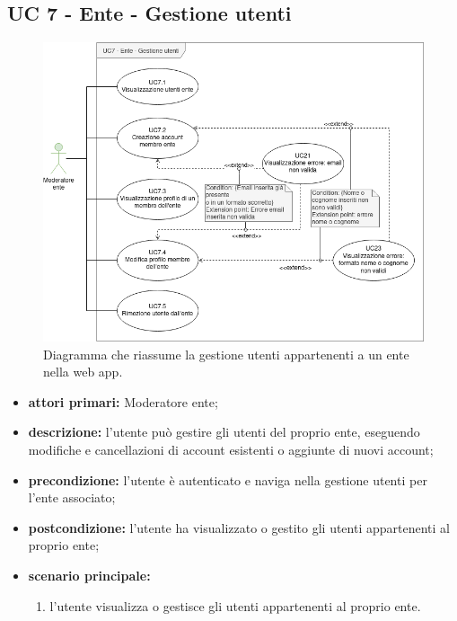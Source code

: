 	\subsection{UC 7 - Ente - Gestione utenti}
		
		\begin{figure}[H]
			\centering
			\includegraphics[scale=0.60]{res/images/uc7}
			\caption{Diagramma che riassume la gestione utenti appartenenti a un ente nella web app.}
		\end{figure}

		\begin{itemize}
			\item \textbf{attori primari:} Moderatore ente;
			\item \textbf{descrizione:} l'utente può gestire gli utenti del proprio ente, eseguendo modifiche e cancellazioni di account esistenti o aggiunte di nuovi account;
			\item \textbf{precondizione:} l'utente è autenticato e naviga nella gestione utenti per l'ente associato;
			\item \textbf{postcondizione:} l'utente ha visualizzato o gestito gli utenti appartenenti al proprio ente;
			\item \textbf{scenario principale:}
			\begin{enumerate}
				\item{l'utente visualizza o gestisce gli utenti appartenenti al proprio ente.}
			\end{enumerate}	
		\end{itemize}
			
